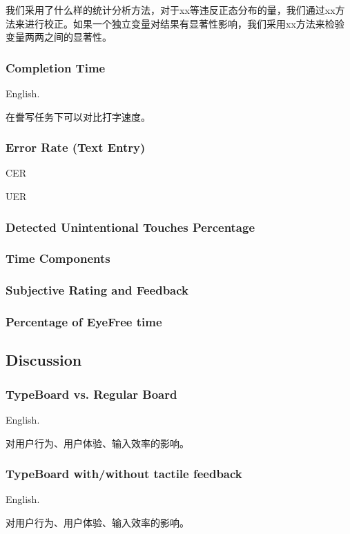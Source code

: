 我们采用了什么样的统计分析方法，对于xx等违反正态分布的量，我们通过xx方法来进行校正。如果一个独立变量对结果有显著性影响，我们采用xx方法来检验变量两两之间的显著性。

\subsubsection{Completion Time}

English.

在誊写任务下可以对比打字速度。

\subsubsection{Error Rate (Text Entry)}

CER

UER

\subsubsection{Detected Unintentional Touches Percentage}

\subsubsection{Time Components}

\subsubsection{Subjective Rating and Feedback}

\subsubsection{Percentage of EyeFree time}

\subsection{Discussion}

\subsubsection{TypeBoard vs. Regular Board}

English.

对用户行为、用户体验、输入效率的影响。

\subsubsection{TypeBoard with/without tactile feedback}

English.

对用户行为、用户体验、输入效率的影响。
